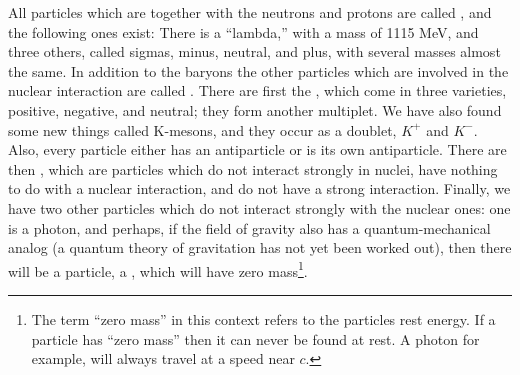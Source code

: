 All particles which are together with the neutrons and protons are called , and the following ones exist: There is a ``lambda,'' with a mass of 1115 MeV, and three others, called sigmas, minus, neutral, and plus, with several masses almost the same. In addition to the baryons the other particles which are involved in the nuclear interaction are called . There are first the , which come in three varieties, positive, negative, and neutral; they form another multiplet. We have also found some new things called K-mesons, and they occur as a doublet, $K^+$ and $K^-$. Also, every particle either has an antiparticle or is its own antiparticle. There are then , which are particles which do not interact strongly in nuclei, have nothing to do with a nuclear interaction, and do not have a strong interaction. Finally, we have two other particles which do not interact strongly with the nuclear ones: one is a photon, and perhaps, if the field of gravity also has a quantum-mechanical analog (a quantum theory of gravitation has not yet been worked out), then there will be a particle, a , which will have zero mass\footnote{The term ``zero mass'' in this context refers to the particles rest energy. If a particle has ``zero mass'' then it can never be found at rest. A photon for example, will always travel at a speed near $c$.}. 














